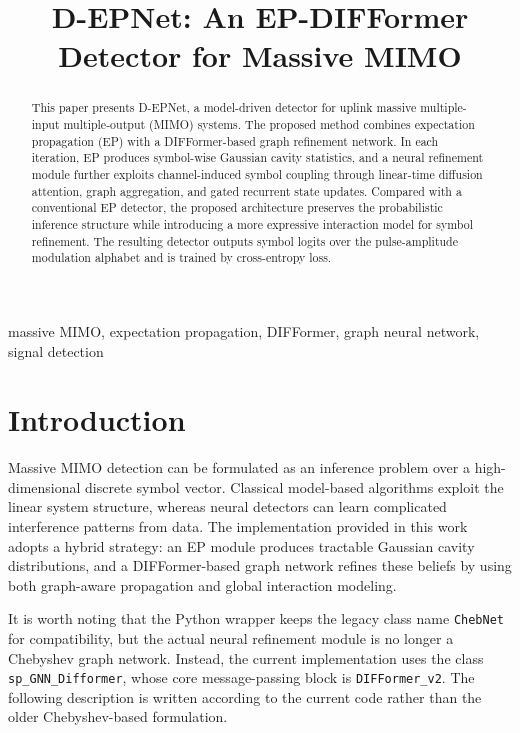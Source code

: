 \documentclass[conference]{IEEEtran}
\begin{document}
\title{D-EPNet: An EP-DIFFormer Detector for Massive MIMO}

\author{
}

\maketitle

\begin{abstract}
This paper presents D-EPNet, a model-driven detector for uplink massive multiple-input multiple-output (MIMO) systems. The proposed method combines expectation propagation (EP) with a DIFFormer-based graph refinement network. In each iteration, EP produces symbol-wise Gaussian cavity statistics, and a neural refinement module further exploits channel-induced symbol coupling through linear-time diffusion attention, graph aggregation, and gated recurrent state updates. Compared with a conventional EP detector, the proposed architecture preserves the probabilistic inference structure while introducing a more expressive interaction model for symbol refinement. The resulting detector outputs symbol logits over the pulse-amplitude modulation alphabet and is trained by cross-entropy loss.
\end{abstract}

\begin{IEEEkeywords}
massive MIMO, expectation propagation, DIFFormer, graph neural network, signal detection
\end{IEEEkeywords}

\section{Introduction}

Massive MIMO detection can be formulated as an inference problem over a high-dimensional discrete symbol vector. Classical model-based algorithms exploit the linear system structure, whereas neural detectors can learn complicated interference patterns from data. The implementation provided in this work adopts a hybrid strategy: an EP module produces tractable Gaussian cavity distributions, and a DIFFormer-based graph network refines these beliefs by using both graph-aware propagation and global interaction modeling.

It is worth noting that the Python wrapper keeps the legacy class name \texttt{ChebNet} for compatibility, but the actual neural refinement module is no longer a Chebyshev graph network. Instead, the current implementation uses the class \texttt{sp\_GNN\_Difformer}, whose core message-passing block is \texttt{DIFFormer\_v2}. The following description is written according to the current code rather than the older Chebyshev-based formulation.
\end{document}
